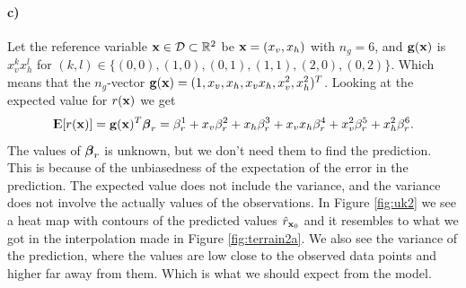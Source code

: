 \paragraph{c)}
Let the reference variable $\boldsymbol{\mathbf{x}} \in \mathcal{D} \subset \mathbb{R}^2$ be $\boldsymbol{\mathbf{x}} = (x_v, x_h)$ with $n_g = 6$, and $\boldsymbol{\mathbf{g}}(\boldsymbol{\mathbf{x}})$ is $x_v^kx_h^l$ for $(k,l) \in \{(0,0),(1,0),(0,1),(1,1),(2,0),(0,2)\}$. Which means that the $n_g$-vector $\boldsymbol{\mathbf{g}}(\boldsymbol{\mathbf{x}}) = (1,x_v,x_h,x_vx_h,x_v^2,x_h^2)^T$. Looking at the expected value for $r(\boldsymbol{\mathbf{x}})$ we get
\begin{equation*}
    {\rm I\kern-.3em E}[r(\boldsymbol{\mathbf{x}})] = \boldsymbol{\mathbf{g}}(\boldsymbol{\mathbf{x}})^T \boldsymbol{\mathbf{\beta}}_r = \beta_r^1 + x_v \beta_r^2 + x_h \beta_r^3 + x_v x_h \beta_r^4 + x_v^2 \beta_r^5 + x_h^2 \beta_r^6.
\end{equation*}
The values of $\boldsymbol{\mathbf{\beta}}_r$ is unknown, but we don't need them to find the prediction. This is because of the unbiasedness of the expectation of the error in the prediction. 
The expected value does not include the variance, and the variance does not involve the actually values of the observations. 
In Figure \ref{fig:uk2} we see a heat map with contours of the predicted values $\hat{r}_{\boldsymbol{\mathbf{x}}_0}$ and it resembles to what we got in the interpolation made in Figure \ref{fig:terrain2a}. We also see the variance of the prediction, where the values are low close to the observed data points and higher far away from them. Which is what we should expect from the model.
